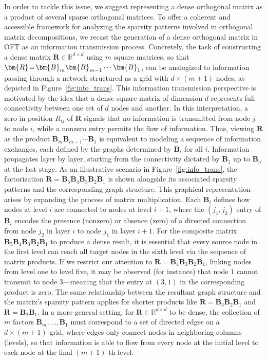 In order to tackle this issue, we suggest representing a dense orthogonal matrix as a product of several sparse orthogonal matrices. To offer a coherent and accessible framework for analyzing the sparsity patterns involved in orthogonal matrix decompositions, we recast the generation of a dense orthogonal matrix in OFT as an information transmission process. Concretely, the task of constructing a dense matrix $\bm{R}\in\mathbb{R}^{d\times d}$ using $m$ square matrices, so that $\thickmuskip=2mu \medmuskip=2mu \bm{R}=\bm{B}_m\bm{B}_{m-1}\cdots\bm{B}_1$, can be analogized to information passing through a network structured as a grid with $d\times (m+1)$ nodes, as depicted in Figure~\ref{fig:info_trans}. This information transmission perspective is motivated by the idea that a dense square matrix of dimension $d$ represents full connectivity between one set of $d$ nodes and another. In this interpretation, a zero in position $R_{ij}$ of $\bm{R}$ signals that no information is transmitted from node $j$ to node $i$, while a nonzero entry permits the flow of information. Thus, viewing $\bm{R}$ as the product $\bm{B}_m\bm{B}_{m-1}\cdots\bm{B}_1$ is equivalent to modeling a sequence of information exchanges, each defined by the graphs determined by $\bm{B}_i$ for all $i$. Information propagates layer by layer, starting from the connectivity dictated by $\bm{B}_1$ up to $\bm{B}_n$ at the last stage. As an illustrative scenario in Figure~\ref{fig:info_trans}, the factorization $\bm{R}=\bm{B}_5\bm{B}_4\bm{B}_3\bm{B}_2\bm{B}_1$ is shown alongside its associated sparsity patterns and the corresponding graph structure. This graphical representation arises by expanding the process of matrix multiplication. Each $\bm{B}_i$ defines how nodes at level $i$ are connected to nodes at level $i+1$, where the $(j_1,j_2)$ entry of $\bm{B}_i$ encodes the presence (nonzero) or absence (zero) of a directed connection from node $j_2$ in layer $i$ to node $j_1$ in layer $i+1$. For the composite matrix $\bm{B}_5\bm{B}_4\bm{B}_3\bm{B}_2\bm{B}_1$ to produce a dense result, it is essential that every source node in the first level can reach all target nodes in the sixth level via the sequence of matrix products. If we restrict our attention to $\bm{R}=\bm{B}_4\bm{B}_3\bm{B}_2\bm{B}_1$, linking nodes from level one to level five, it may be observed (for instance) that node $1$ cannot transmit to node $3$—meaning that the entry at $(3,1)$ in the corresponding product is zero. The same relationship between the resultant graph structure and the matrix's sparsity pattern applies for shorter products like $\bm{R}=\bm{B}_3\bm{B}_2\bm{B}_1$ and $\bm{R}=\bm{B}_2\bm{B}_1$. In a more general setting, for $\bm{R}\in\mathbb{R}^{d\times d}$ to be dense, the collection of $m$ factors $\bm{B}_m,\dots,\bm{B}_1$ must correspond to a set of directed edges on a $d\times (m+1)$ grid, where edges only connect nodes in neighboring columns (levels), so that information is able to flow from every node at the initial level to each node at the final $(m+1)$-th level.

